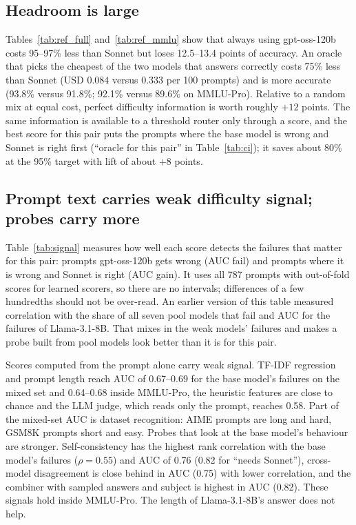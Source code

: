 \documentclass[11pt]{article}
\begin{document}
\subsection{Headroom is large}
Tables~\ref{tab:ref_full} and~\ref{tab:ref_mmlu} show that always using gpt-oss-120b costs 95--97\% less than Sonnet but loses 12.5--13.4 points of accuracy. An oracle that picks the cheapest of the two models that answers correctly costs 75\% less than Sonnet (USD 0.084 versus 0.333 per 100 prompts) and is more accurate (93.8\% versus 91.8\%; 92.1\% versus 89.6\% on MMLU-Pro). Relative to a random mix at equal cost, perfect difficulty information is worth roughly $+12$ points. The same information is available to a threshold router only through a score, and the best score for this pair puts the prompts where the base model is wrong and Sonnet is right first (``oracle for this pair'' in Table~\ref{tab:ci}); it saves about 80\% at the 95\% target with lift of about $+8$ points.




\subsection{Prompt text carries weak difficulty signal; probes carry more}
Table~\ref{tab:signal} measures how well each score detects the failures that matter for this pair: prompts gpt-oss-120b gets wrong (AUC fail) and prompts where it is wrong and Sonnet is right (AUC gain). It uses all 787 prompts with out-of-fold scores for learned scorers, so there are no intervals; differences of a few hundredths should not be over-read. An earlier version of this table measured correlation with the share of all seven pool models that fail and AUC for the failures of Llama-3.1-8B. That mixes in the weak models' failures and makes a probe built from pool models look better than it is for this pair.



Scores computed from the prompt alone carry weak signal. TF-IDF regression and prompt length reach AUC of 0.67--0.69 for the base model's failures on the mixed set and 0.64--0.68 inside MMLU-Pro, the heuristic features are close to chance and the LLM judge, which reads only the prompt, reaches 0.58. Part of the mixed-set AUC is dataset recognition: AIME prompts are long and hard, GSM8K prompts short and easy. Probes that look at the base model's behaviour are stronger. Self-consistency has the highest rank correlation with the base model's failures ($\rho=0.55$) and AUC of 0.76 (0.82 for ``needs Sonnet''), cross-model disagreement is close behind in AUC (0.75) with lower correlation, and the combiner with sampled answers and subject is highest in AUC (0.82). These signals hold inside MMLU-Pro. The length of Llama-3.1-8B's answer does not help.
\end{document}
